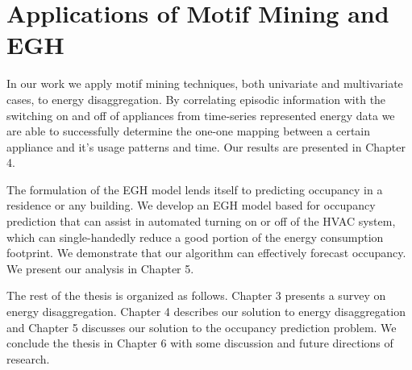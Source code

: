 \section{Applications of Motif Mining and EGH}
In our work we apply motif mining techniques, both univariate and multivariate cases, to energy disaggregation. By correlating episodic information with the switching on and off of appliances from time-series represented energy data we are able to successfully determine the one-one mapping between a certain appliance and it's usage patterns and time. Our results are presented in Chapter 4.

The formulation of the EGH model lends itself to predicting occupancy in a residence or any building. We develop an EGH model based for occupancy prediction that can assist in automated turning on or off of the HVAC system, which can single-handedly reduce a good portion of the energy consumption footprint. We demonstrate that our algorithm can effectively forecast occupancy.  We present our analysis in Chapter 5.

The rest of the thesis is organized as follows. Chapter 3 presents a survey on energy disaggregation. Chapter 4 describes our solution to energy disaggregation and Chapter 5 discusses our solution to the occupancy prediction problem. We conclude the thesis in Chapter 6 with some discussion and future directions of research.  



